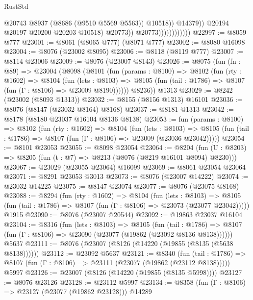 \begin{lexlean}{RustStd}
\begin{coremodule}
                                          @20743
                                          @8937
                                          (@8686 (@9510 @5569 @5563))
                                          @10518))
                                      @14379))
                                  @20194
                                  @20197
                                  @20200
                                  @20203
                                  @10518)
                                @20773))
                            @20773))))))))))))
@22997 := @8059 @777
@23001 := @8061 (@8065 @777) (@8071 @777)
@23002 := @8080 @16098
@23004 := @8076 (@23002 @8095)
@23006 := @8118 (@8119 @777)
@23007 := @8114 @23006
@23009 := @8076 (@23007 @8143)
@23026 := @8075
    (fun (fn : @89) =>
    @23004
      (@8098
        (@8101
          (fun (params : @8100) =>
          @8102
            (fun (rty : @1602) =>
            @8104
              (fun (lets : @8103) =>
              @8105 (fun (tail : @1786) => @8107 (fun (Γ : @8106) => @23009 @8190))))))
        @8236))
    @1313
@23029 := @8242 (@23002 (@8093 @1313))
@23032 := @8155 (@8156 @1313) @16101
@23036 := @8076 (@8147 (@23032 @8164) @8168)
@23037 := @8181 @1313
@23042 := @8178 (@8180 @23037 @16104 @8136 @8138)
@23053 := fun (params : @8100) =>
  @8102
    (fun (rty : @1602) =>
    @8104
      (fun (lets : @8103) =>
      @8105 (fun (tail : @1786) => @8107 (fun (Γ : @8106) => @23009 (@23036 @23042)))))
@23054 := @8101 @23053
@23055 := @8098 @23054
@23064 := @8204
    (fun (U : @8203) => @8205 (fun (t : @7) => @8213 (@8076 (@8219 @16101 @8094) @8230)))
@23067 := @23029 (@23055 @23064) @16099
@23069 := @8061 @23054 @23064
@23071 := @8291 @23053 @3013
@23073 := @8076 (@23007 @14222)
@23074 := @23032 @14225
@23075 := @8147 @23074
@23077 := @8076 (@23075 @8168)
@23088 := @8294
    (fun (rty : @1602) =>
    @8104
      (fun (lets : @8103) =>
      @8105 (fun (tail : @1786) => @8107 (fun (Γ : @8106) => @23073 (@23077 @23042)))))
    @1915
@23090 := @8076 (@23007 @20544)
@23092 := @19863 @23037 @16104
@23104 := @8316
    (fun (lets : @8103) =>
    @8105
      (fun (tail : @1786) =>
      @8107 (fun (Γ : @8106) => @23090 (@23077 (@19862 (@23092 @8136 @8138))))))
    @5637
@23111 := @8076 (@23007 (@8126 (@14220 (@19855 (@8135 (@5638 @8138))))))
@23112 := @23092 @5637
@23121 := @8340
    (fun (tail : @1786) => @8107 (fun (Γ : @8106) => @23111 (@23077 (@19862 (@23112 @8138)))))
    @5997
@23126 := @23007 (@8126 (@14220 (@19855 (@8135 @5998))))
@23127 := @8076 @23126
@23128 := @23112 @5997
@23134 := @8358 (fun (Γ : @8106) => @23127 (@23077 (@19862 @23128))) @14289

\end{coremodule}
\end{lexlean}

